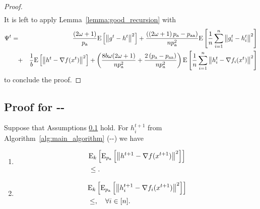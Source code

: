 \documentclass{article}
\newcommand*{\probavailable}{\ensuremath{p_{\textnormal{a}}}}
\newcommand*{\probpairaa}{\ensuremath{p_{\textnormal{aa}}}}
\begin{document}
\begin{proof}
\begin{align*}
    \end{align*}
    It is left to apply Lemma~\ref{lemma:good_recursion} with 
    \begin{eqnarray*}
      \Psi^t &=& \frac{(2 \omega + 1)}{\probavailable} \Exp{\norm{g^{t} - h^{t}}^2} + \frac{(\left(2 \omega + 1\right)\probavailable - \probpairaa)}{n \probavailable^2} \Exp{\frac{1}{n}\sum_{i=1}^n\norm{g^{t}_i - h^{t}_i}^2} \\
        &\quad +& \frac{1}{b} \Exp{\norm{h^{t} - \nabla f(x^{t})}^2} + \left(\frac{8 b \omega (2 \omega + 1)}{n \probavailable^2} + \frac{2 \left(\probavailable - \probpairaa\right)}{n \probavailable^2}\right)\Exp{\frac{1}{n}\sum_{i=1}^n\norm{h^{t}_i - \nabla f_i(x^{t})}^2}
    \end{eqnarray*}
    to conclude the proof.
\end{proof}

\subsection{Proof for --}

\begin{lemma}
  Suppose that Assumptions \ref{} hold. For $h^{t+1}_i$ from Algorithm~\ref{alg:main_algorithm} (--) we have
  \begin{enumerate}
  \item
      \begin{align*}
          &\ExpSub{k}{\ExpSub{\probavailable}{\norm{h^{t+1} - \nabla f(x^{t+1})}^2}} \\
          & \leq .
      \end{align*}
  \item
      \begin{align*}
          &\ExpSub{k}{\ExpSub{\probavailable}{\norm{h^{t+1}_i - \nabla f_i(x^{t+1})}^2}} \\
          & \leq , \quad \forall i \in [n].
      \end{align*}
  \end{enumerate}
\end{lemma}
\end{document}
